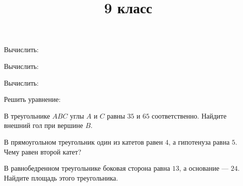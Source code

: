 \newpage
\title{9 класс}
\begin{listofex}
	\item Вычислить:
	\begin{enumcols}[itemcolumns=3]
		\item {}
		\item {}
		\item {}
		\item {}
	\end{enumcols}
	\item Вычислить:
	\begin{enumcols}[itemcolumns=3]
		\item {}
		\item {}
		\item {}
		\item {}
		\item {}
	\end{enumcols}
	\item Вычислить:
	\begin{enumcols}[itemcolumns=2]
		\item {}
		\item {}
	\end{enumcols}
	\item Решить уравнение:
	\begin{enumcols}[itemcolumns=3]
		\item {}
		\item {}
		\item {}
	\end{enumcols}
	\item В треугольнике \( ABC \) углы \( A \) и \( C \) равны \( 35 \) и \( 65 \) соответственно. Найдите внешний гол при вершине \( B \).
	\item В прямоугольном треугольник один из катетов равен \( 4 \), а гипотенуза равна \( 5 \). Чему равен второй катет?
	\item В равнобедренном треугольнике боковая сторона равна \( 13 \), а основание --- \( 24 \). Найдите площадь этого треугольника.
\end{listofex}